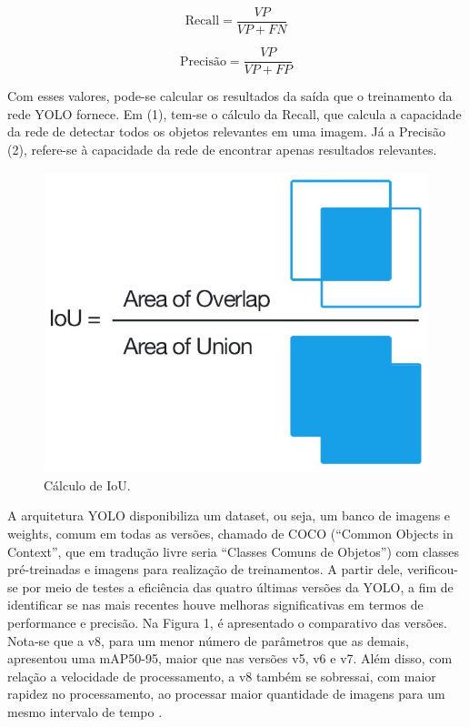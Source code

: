 \begin{equation}
    \text{Recall} = \frac{VP}{VP + FN} \tag{1}
\end{equation}
    
\begin{equation}
    \text{Precisão} = \frac{VP}{VP + FP} \tag{2}
\end{equation}

Com esses valores, pode-se calcular os resultados da saída que o treinamento da rede YOLO fornece. Em (1), tem-se o cálculo da Recall, que calcula a capacidade da rede de detectar todos os objetos relevantes em uma imagem. Já a Precisão (2), refere-se à capacidade da rede de encontrar apenas resultados relevantes. 

\begin{figure}[!h]
    \center
    \begin{minipage}{0.6\linewidth}
    \center
    \captionsetup{justification=centering,margin=0.5cm,font=small}
    \includegraphics[width=0.7\linewidth]{img/cap2/iou.png}
    \caption{ Cálculo de IoU. \cite{padilla2020survey}} \label{subfig:iou}
    \end{minipage}
\end{figure}

A arquitetura YOLO disponibiliza um dataset, ou seja, um banco de imagens e weights, comum em todas as versões, chamado de COCO (“Common Objects in Context”, que em tradução livre seria “Classes Comuns de Objetos”) com classes pré-treinadas e imagens para realização de treinamentos. A partir dele, verificou-se por meio de testes a eficiência das quatro últimas versões da YOLO, a fim de identificar se nas mais recentes houve melhoras significativas em termos de performance e precisão. Na Figura 1, é apresentado o comparativo das versões. Nota-se que a v8, para um menor número de parâmetros que as demais, apresentou uma mAP50-95, maior que nas versões v5, v6 e v7. Além disso, com relação a velocidade de processamento, a v8 também se sobressai, com maior rapidez no processamento, ao processar maior quantidade de imagens para um mesmo intervalo de tempo \cite{padilla2020survey}.

